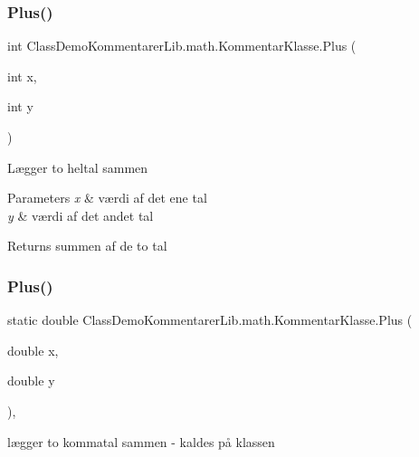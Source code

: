 \subsubsection{\texorpdfstring{Plus()}{Plus()}\hspace{0.1cm}{\footnotesize\ttfamily [1/2]}}
{\footnotesize\ttfamily int Class\+Demo\+Kommentarer\+Lib.\+math.\+Kommentar\+Klasse.\+Plus (\begin{DoxyParamCaption}\item[{int}]{x,  }\item[{int}]{y }\end{DoxyParamCaption})\hspace{0.3cm}{\ttfamily [inline]}}



Lægger to heltal sammen 


\begin{DoxyParams}{Parameters}
{\em x} & værdi af det ene tal\\
\hline
{\em y} & værdi af det andet tal\\
\hline
\end{DoxyParams}
\begin{DoxyReturn}{Returns}
summen af de to tal
\end{DoxyReturn}
\mbox{\label{class_class_demo_kommentarer_lib_1_1math_1_1_kommentar_klasse_a0195f515fd2db15c72c908f938ac7060}} 
\subsubsection{\texorpdfstring{Plus()}{Plus()}\hspace{0.1cm}{\footnotesize\ttfamily [2/2]}}
{\footnotesize\ttfamily static double Class\+Demo\+Kommentarer\+Lib.\+math.\+Kommentar\+Klasse.\+Plus (\begin{DoxyParamCaption}\item[{double}]{x,  }\item[{double}]{y }\end{DoxyParamCaption})\hspace{0.3cm}{\ttfamily [inline]}, {\ttfamily [static]}}



lægger to kommatal sammen -\/ kaldes på klassen 


